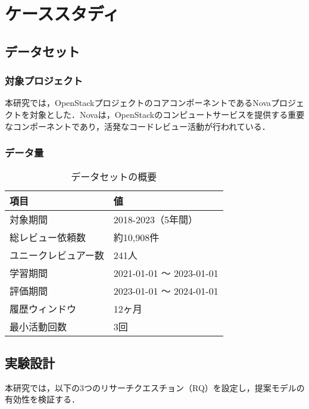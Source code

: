 \section{ケーススタディ}
\label{config}

\subsection{データセット}

\subsubsection{対象プロジェクト}
本研究では，OpenStackプロジェクトのコアコンポーネントであるNovaプロジェクトを対象とした．Novaは，OpenStackのコンピュートサービスを提供する重要なコンポーネントであり，活発なコードレビュー活動が行われている．

\subsubsection{データ量}
\begin{table}[h]
    \centering
    \caption{データセットの概要}
    \begin{tabularx}{\columnwidth}{XX}
        \hline
        項目 & 値 \\
        \hline
        対象期間 & 2018-2023（5年間） \\
        総レビュー依頼数 & 約10,908件 \\
        ユニークレビュアー数 & 241人 \\
        学習期間 & 2021-01-01 ～ 2023-01-01 \\
        評価期間 & 2023-01-01 ～ 2024-01-01 \\
        履歴ウィンドウ & 12ヶ月 \\
        最小活動回数 & 3回 \\
        \hline
    \end{tabularx}
    \label{table:dataset}
\end{table}

\subsection{実験設計}

本研究では，以下の3つのリサーチクエスチョン（RQ）を設定し，提案モデルの有効性を検証する．

